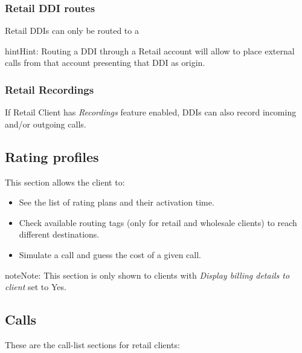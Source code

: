 \documentclass[letterpaper,10pt,english]{sphinxmanual}
\begin{document}
\subsubsection{Retail DDI routes}
\label{administration_portal/client/retail/ddis:retail-ddi-routes}
Retail DDIs can only be routed to a {\hyperref[administration_portal/client/retail/retail_accounts:retail\string-accounts]{}}

\begin{notice}{hint}{Hint:}
Routing a DDI through a Retail account will allow to place external calls
from that account presenting that DDI as origin.
\end{notice}


\subsubsection{Retail Recordings}
\label{administration_portal/client/retail/ddis:retail-recordings}
If Retail Client has \emph{Recordings} feature enabled, DDIs can also record incoming and/or
outgoing calls.


\subsection{Rating profiles}
\label{administration_portal/client/retail/rating_profiles:rating-profiles}\label{administration_portal/client/retail/rating_profiles::doc}
This section allows the client to:
\begin{itemize}
\item {} 
See the list of rating plans and their activation time.

\item {} 
Check available routing tags (only for retail and wholesale clients) to reach different destinations.

\item {} 
Simulate a call and guess the cost of a given call.

\end{itemize}

\begin{notice}{note}{Note:}
This section is only shown to clients with \emph{Display billing details to client} set to Yes.
\end{notice}


\subsection{Calls}
\label{administration_portal/client/retail/calls/index::doc}\label{administration_portal/client/retail/calls/index:calls}
These are the call-list sections for retail clients:
\end{document}

